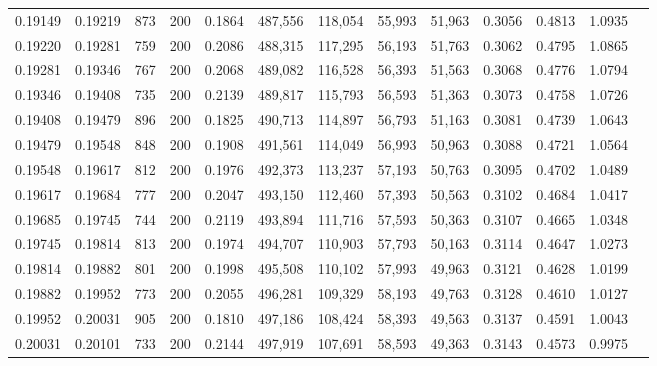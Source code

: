 \begin{tabular}{rrrrrrrrrrrrr}
0.19149 & 0.19219 &   873 & 200 &                                     0.1864 & 487,556 & 118,054 &  55,993 &  51,963 & 0.3056 & 0.4813 & 1.0935 \\
0.19220 & 0.19281 &   759 & 200 &                                     0.2086 & 488,315 & 117,295 &  56,193 &  51,763 & 0.3062 & 0.4795 & 1.0865 \\
0.19281 & 0.19346 &   767 & 200 &                                     0.2068 & 489,082 & 116,528 &  56,393 &  51,563 & 0.3068 & 0.4776 & 1.0794 \\
0.19346 & 0.19408 &   735 & 200 &                                     0.2139 & 489,817 & 115,793 &  56,593 &  51,363 & 0.3073 & 0.4758 & 1.0726 \\
0.19408 & 0.19479 &   896 & 200 &                                     0.1825 & 490,713 & 114,897 &  56,793 &  51,163 & 0.3081 & 0.4739 & 1.0643 \\
0.19479 & 0.19548 &   848 & 200 &                                     0.1908 & 491,561 & 114,049 &  56,993 &  50,963 & 0.3088 & 0.4721 & 1.0564 \\
0.19548 & 0.19617 &   812 & 200 &                                     0.1976 & 492,373 & 113,237 &  57,193 &  50,763 & 0.3095 & 0.4702 & 1.0489 \\
0.19617 & 0.19684 &   777 & 200 &                                     0.2047 & 493,150 & 112,460 &  57,393 &  50,563 & 0.3102 & 0.4684 & 1.0417 \\
0.19685 & 0.19745 &   744 & 200 &                                     0.2119 & 493,894 & 111,716 &  57,593 &  50,363 & 0.3107 & 0.4665 & 1.0348 \\
0.19745 & 0.19814 &   813 & 200 &                                     0.1974 & 494,707 & 110,903 &  57,793 &  50,163 & 0.3114 & 0.4647 & 1.0273 \\
0.19814 & 0.19882 &   801 & 200 &                                     0.1998 & 495,508 & 110,102 &  57,993 &  49,963 & 0.3121 & 0.4628 & 1.0199 \\
0.19882 & 0.19952 &   773 & 200 &                                     0.2055 & 496,281 & 109,329 &  58,193 &  49,763 & 0.3128 & 0.4610 & 1.0127 \\
0.19952 & 0.20031 &   905 & 200 &                                     0.1810 & 497,186 & 108,424 &  58,393 &  49,563 & 0.3137 & 0.4591 & 1.0043 \\
0.20031 & 0.20101 &   733 & 200 &                                     0.2144 & 497,919 & 107,691 &  58,593 &  49,363 & 0.3143 & 0.4573 & 0.9975 \\

\end{tabular}
